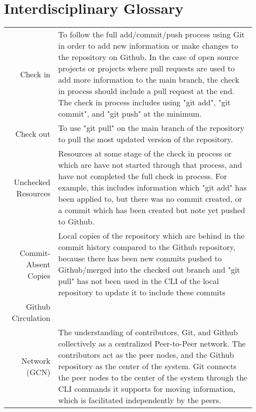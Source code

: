 \chapter*{Interdisciplinary Glossary}

\begin{center}
\begin{longtable}{r p{}}

Check in & To follow the full add/commit/push process using Git in order to add new information or make changes to the repository on Github. In the case of open source projects or projects where pull requests are used to add more information to the main branch, the check in process should include a pull request at the end. The check in process includes using "git add", "git commit", and "git push" at the minimum. \\

Check out & To use "git pull" on the main branch of the repository to pull the most updated version of the repository. \\

Unchecked Resources & Resources at some stage of the check in process or which are have not started through that process, and have not completed the full check in process. For example, this includes information which "git add" has been applied to, but there was no commit created, or a commit which has been created but note yet pushed to Github. \\

Commit-Absent Copies & Local copies of the repository which are behind in the commit history compared to the Github repository, because there has been new commits pushed to Github/merged into the checked out branch and "git pull" has not been used in the CLI of the local repository to update it to include these commits \\

Github Circulation\\ Network (GCN) & The understanding of contributors, Git, and Github collectively as a centralized Peer-to-Peer network. The contributors act as the peer nodes, and the Github repository as the center of the system. Git connects the peer nodes to the center of the system through the CLI commands it supports for moving information, which is facilitated independently by the peers. \\

\end{longtable}
\end{center}

